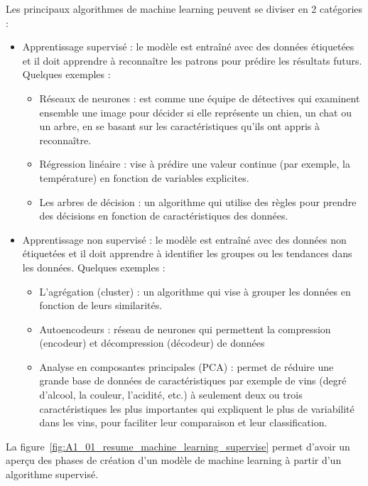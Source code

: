 \par{Les principaux algorithmes de machine learning peuvent se diviser en 2 catégories :
\begin{itemize}
    \item Apprentissage supervisé : le modèle est entraîné avec des données étiquetées et il doit apprendre à reconnaître les patrons pour prédire les résultats futurs. Quelques exemples :
    \begin{itemize}
        \item Réseaux de neurones : est comme une équipe de détectives qui examinent ensemble une image pour décider si elle représente un chien, un chat ou un arbre, en se basant sur les caractéristiques qu'ils ont appris à reconnaître.
        \item Régression linéaire : vise à prédire une valeur continue (par exemple, la température) en fonction de variables explicites.
        \item Les arbres de décision : un algorithme qui utilise des règles pour prendre des décisions en fonction de caractéristiques des données.
    \end{itemize}
    \item Apprentissage non supervisé : le modèle est entraîné avec des données non étiquetées et il doit apprendre à identifier les groupes ou les tendances dans les données. Quelques exemples :
    \begin{itemize}
        \item L'agrégation (cluster) : un algorithme qui vise à grouper les données en fonction de leurs similarités.
        \item Autoencodeurs : réseau de neurones qui permettent la compression (encodeur) et décompression (décodeur) de données
        \item Analyse en composantes principales (PCA) : permet de réduire une grande base de données de caractéristiques par exemple de vins (degré d'alcool, la couleur, l'acidité, etc.) à seulement deux ou trois caractéristiques les plus importantes qui expliquent le plus de variabilité dans les vins, pour faciliter leur comparaison et leur classification.
    \end{itemize}
\end{itemize}}

\par{La figure~\ref{fig:A1_01_resume_machine_learning_supervise} permet d'avoir un aperçu des phases de création d'un modèle de machine learning à partir d'un algorithme supervisé.}

